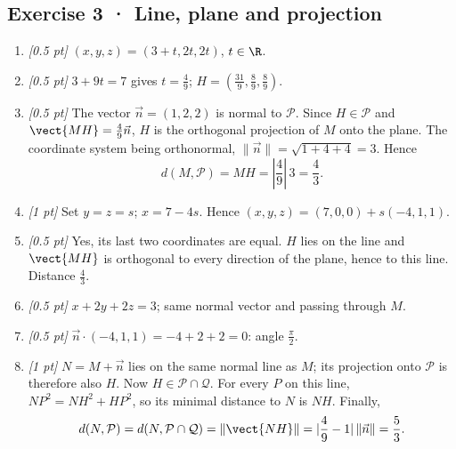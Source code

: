 \subsection*{Exercise 3 · Line, plane and projection}\begin{enumerate}

\item \textit{[0.5 pt]} $(x,y,z)=(3+t,2t,2t)$, $t\in\R$.

\item \textit{[0.5 pt]} $3+9t=7$ gives $t=\frac{4}{9}$; $H=(\frac{31}{9},\frac{8}{9},\frac{8}{9})$.

\item \textit{[0.5 pt]} The vector $\vec n=(1,2,2)$ is normal to $\mathcal P$. Since $H\in\mathcal P$ and $\vect{MH}=\frac{4}{9}\vec n$, $H$ is the orthogonal projection of $M$ onto the plane. The coordinate system being orthonormal, $\|\vec n\|=\sqrt{1+4+4}=3$. Hence
\[d(M,\mathcal P)=MH=|\frac{4}{9}|\,3=\frac{4}{3}.\]

\item \textit{[1 pt]} Set $y=z=s$; $x=7-4s$. Hence $(x,y,z)=(7,0,0)+s(-4,1,1)$.

\item \textit{[0.5 pt]} Yes, its last two coordinates are equal. $H$ lies on the line and $\vect{MH}$ is orthogonal to every direction of the plane, hence to this line. Distance $\frac{4}{3}$.

\item \textit{[0.5 pt]} $x+2y+2z=3$; same normal vector and passing through $M$.

\item \textit{[0.5 pt]} $\vec n\cdot(-4,1,1)=-4+2+2=0$: angle $\frac{\pi}{2}$.

\item \textit{[1 pt]} $N=M+\vec n$ lies on the same normal line as $M$; its projection onto $\mathcal P$ is therefore also $H$. Now $H\in\mathcal P\cap\mathcal Q$. For every $P$ on this line, $NP^2=NH^2+HP^2$, so its minimal distance to $N$ is $NH$. Finally,
\[d(N,\mathcal P)=d(N,\mathcal P\cap\mathcal Q)=\|\vect{NH}\|=|\frac{4}{9}-1|\,\|\vec n\|=\frac{5}{3}.\]

\end{enumerate}

